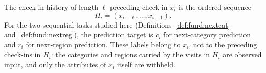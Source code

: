 \begin{definition}\label{def:fund:history}
    The check-in history of length $\ell$ preceding check-in $x_i$ is the ordered sequence
    \begin{equation}
        H_i=(x_{i-\ell},\ldots,x_{i-1}).
    \end{equation}
    For the two sequential tasks studied here (Definitions~\ref{def:fund:nextcat}
    and~\ref{def:fund:nextreg}), the prediction target is $c_i$ for next-category
    prediction and $r_i$ for next-region prediction. These labels belong to $x_i$, not
    to the preceding check-ins in $H_i$: the categories and regions carried by the
    visits in $H_i$ are observed input, and only the attributes of $x_i$ itself are
    withheld.
\end{definition}

